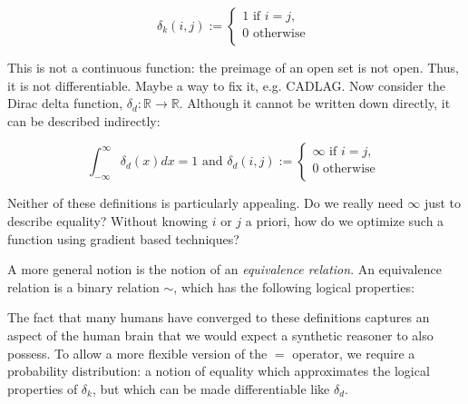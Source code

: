 \documentclass[11pt]{article}
\begin{document}
    $$
    \delta_k(i, j) :=
    \begin{cases}
        1 \text{ if } i = j, \\
        0 \text{ otherwise }\\
    \end{cases}
    $$

    This is not a continuous function: the preimage of an open set is not open. Thus, it is not differentiable. Maybe a way to fix it, e.g. CADLAG. Now consider the Dirac delta function, $\delta_d: \mathbb{R} \rightarrow \mathbb{R}$. Although it cannot be written down directly, it can be described indirectly:

    $$
    \int_{-\infty}^{\infty} \delta_d (x)dx = 1 \text{ and } \delta_d(i, j) :=
    \begin{cases}
        \infty \text{ if } i = j, \\
        0 \text{ otherwise }\\
    \end{cases}
    $$

    Neither of these definitions is particularly appealing. Do we really need $\infty$ just to describe equality? Without knowing $i$ or $j$ a priori, how do we optimize such a function using gradient based techniques?


    A more general notion is the notion of an \textit{equivalence relation}. An equivalence relation is a binary relation $\sim$, which has the following logical properties:


    The fact that many humans have converged to these definitions captures an aspect of the human brain that we would expect a synthetic reasoner to also possess. To allow a more flexible version of the $=$ operator, we require a probability distribution: a notion of equality which approximates the logical properties of $\delta_k$, but which can be made differentiable like $\delta_d$.
\end{document}
